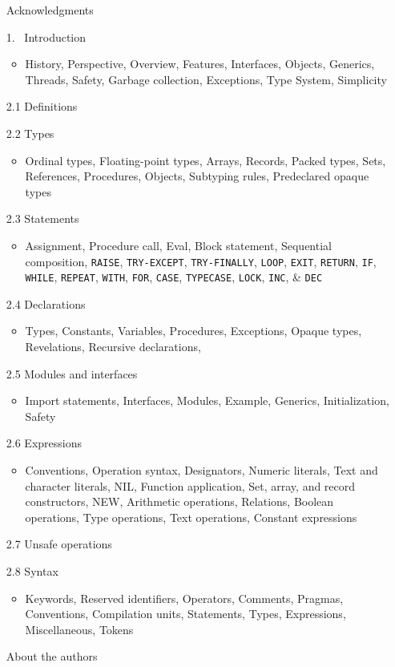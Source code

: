 \documentclass[10pt]{article}
\begin{document}
\begin{itemize}
\item[] Acknowledgments
\item[1.~] Introduction
   \begin{itemize}
  \item History, Perspective, Overview, Features, Interfaces, Objects,
    Generics, Threads, Safety, Garbage collection, Exceptions, Type System,
    Simplicity
  \end{itemize}
\item[2.1] Definitions
\item[2.2] Types
  \begin{itemize}
  \item Ordinal types, Floating-point types, Arrays, Records, Packed types,
    Sets, References, Procedures, Objects, Subtyping rules, Predeclared opaque
    types
  \end{itemize}
\item[2.3] Statements
  \begin{itemize}
  \item Assignment, Procedure call, Eval, Block statement, Sequential
    composition, \verb|RAISE|, \verb|TRY-EXCEPT|, \verb|TRY-FINALLY|,
    \verb|LOOP|, \verb|EXIT|, \verb|RETURN|, \verb|IF|, \verb|WHILE|,
    \verb|REPEAT|, \verb|WITH|, \verb|FOR|, \verb|CASE|, \verb|TYPECASE|,
    \verb|LOCK|, \verb|INC|, \& \verb|DEC|
  \end{itemize}
\item[2.4] Declarations
  \begin{itemize}
  \item Types, Constants, Variables, Procedures, Exceptions, Opaque types,
    Revelations, Recursive declarations,
  \end{itemize}
\item[2.5] Modules and interfaces
  \begin{itemize}
  \item Import statements, Interfaces, Modules, Example, Generics,
    Initialization, Safety
  \end{itemize}
\item[2.6] Expressions
  \begin{itemize}
  \item Conventions, Operation syntax, Designators, Numeric literals, Text and
    character literals, NIL, Function application, Set, array, and record
    constructors, NEW, Arithmetic operations, Relations, Boolean operations,
    Type operations, Text operations, Constant expressions
  \end{itemize}
\item[2.7] Unsafe operations
\item[2.8] Syntax
  \begin{itemize}
  \item Keywords, Reserved identifiers, Operators, Comments, Pragmas,
    Conventions, Compilation units, Statements, Types, Expressions,
    Miscellaneous, Tokens
  \end{itemize}
\item[] About the authors
\end{itemize}
\end{document}

